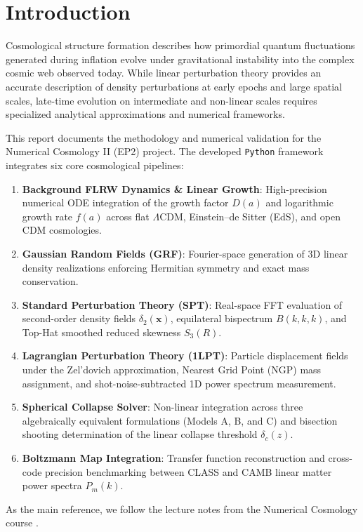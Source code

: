 \section{Introduction}

Cosmological structure formation describes how primordial quantum fluctuations generated during inflation evolve under gravitational instability into the complex cosmic web observed today.
While linear perturbation theory provides an accurate description of density perturbations at early epochs and large spatial scales, late-time evolution on intermediate and non-linear scales requires specialized analytical approximations and numerical frameworks.

This report documents the methodology and numerical validation for the Numerical Cosmology II (EP2) project. The developed \texttt{Python} framework integrates six core cosmological pipelines:
    \begin{enumerate}
        \item \textbf{Background FLRW Dynamics \& Linear Growth}: High-precision numerical ODE integration of the growth factor $D(a)$ and logarithmic growth rate $f(a)$ across flat $\Lambda$CDM, Einstein--de Sitter (EdS), and open CDM cosmologies.
        
        \item \textbf{Gaussian Random Fields (GRF)}: Fourier-space generation of 3D linear density realizations enforcing Hermitian symmetry and exact mass conservation.
        
        \item \textbf{Standard Perturbation Theory (SPT)}: Real-space FFT evaluation of second-order density fields $\delta_2(\mathbf{x})$, equilateral bispectrum $B(k,k,k)$, and Top-Hat smoothed reduced skewness $S_3(R)$.
        
        \item \textbf{Lagrangian Perturbation Theory (1LPT)}: Particle displacement fields under the Zel'dovich approximation, Nearest Grid Point (NGP) mass assignment, and shot-noise-subtracted 1D power spectrum measurement.
        
        \item \textbf{Spherical Collapse Solver}: Non-linear integration across three algebraically equivalent formulations (Models A, B, and C) and bisection shooting determination of the linear collapse threshold $\delta_c(z)$.
        
        \item \textbf{Boltzmann Map Integration}: Transfer function reconstruction and cross-code precision benchmarking between CLASS and CAMB linear matter power spectra $P_m(k)$.
    \end{enumerate}
    
As the main reference, we follow the lecture notes from the Numerical Cosmology course \parencite{Tiago_Batalha_Lecture_5, Tiago_Batalha_Lecture_6, Tiago_Batalha_Lecture_7, Tiago_Batalha_Lecture_8, Tiago_Batalha_Lecture_9}. 